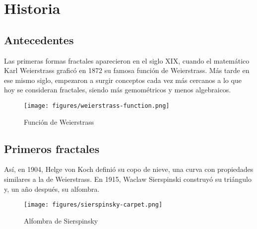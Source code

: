 \chapter{Historia}

\section{Antecedentes}

\noindent Las primeras formas fractales aparecieron en el siglo XIX, cuando el matemático Karl Weierstrass graficó en 1872 su famosa función de Weierstrass. Más tarde en ese mismo siglo, empezaron a surgir conceptos cada vez más cercanos a lo que hoy se consideran fractales, siendo más gemométricos y menos algebraicos.

\begin{figure}[H]
    \centering
    \texttt{[image: figures/weierstrass-function.png]}
    \caption{Función de Weierstrass}
    \label{fig:weierstrass-function}
\end{figure}

\section{Primeros fractales}

\noindent Así, en 1904, Helge von Koch definió su copo de nieve, una curva con propiedades similares a la de Weierstrass. En 1915, Waclaw Sierspinski construyó su triángulo y, un año después, su alfombra.

\begin{figure}[H]
    \centering
    \texttt{[image: figures/sierspinsky-carpet.png]}
    \caption{Alfombra de Sierspinsky}
    \label{fig:sierspinsky-carpet}
\end{figure}